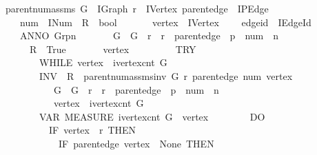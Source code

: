 \begin{isabellebody}
\ parent{\isacharunderscore}num{\isacharunderscore}assms\ {\isacharparenleft}G\ {\isacharcolon}{\isacharcolon}\ IGraph{\isacharcomma}\ r\ {\isacharcolon}{\isacharcolon}\ IVertex{\isacharcomma}\ parent{\isacharunderscore}edge\ {\isacharcolon}{\isacharcolon}\ IPEdge{\isacharcomma}\isanewline
\ \ \ \ num\ {\isacharcolon}{\isacharcolon}\ INum\ {\isacharbar}\ R\ {\isacharcolon}{\isacharcolon}\ bool{\isacharparenright}\isanewline
\ \ \isanewline
\ \ \ \ vertex\ {\isacharcolon}{\isacharcolon}\ IVertex\isanewline
\ \ \ \ edge{\isacharunderscore}id\ {\isacharcolon}{\isacharcolon}\ IEdge{\isacharunderscore}Id\isanewline
\ \ \ {\isachardoublequoteopen}\isanewline
\ \ \ \ ANNO\ {\isacharparenleft}G{\isacharcomma}r{\isacharcomma}p{\isacharcomma}n{\isacharparenright}{\isachardot}\isanewline
\ \ \ \ \ \ {\isasymlbrace}\ {\isasymacute}G\ {\isacharequal}\ G\ {\isasymand}\ {\isasymacute}r\ {\isacharequal}\ r\ {\isasymand}\ {\isasymacute}parent{\isacharunderscore}edge\ {\isacharequal}\ p\ {\isasymand}\ {\isasymacute}num\ {\isacharequal}\ n\ {\isasymrbrace}\isanewline
\ \ \ \ \ \ {\isasymacute}R\ {\isacharcolon}{\isacharequal}{\isacharequal}\ True\ {\isacharsemicolon}{\isacharsemicolon}\isanewline
\ \ \ \ \ \ {\isasymacute}vertex\ {\isacharcolon}{\isacharequal}{\isacharequal}\ {}\ {\isacharsemicolon}{\isacharsemicolon}\isanewline
\ \ \ \ \ \ TRY\isanewline
\ \ \ \ \ \ \ \ WHILE\ {\isasymacute}vertex\ {\isacharless}\ ivertex{\isacharunderscore}cnt\ {\isasymacute}G\isanewline
\ \ \ \ \ \ \ \ INV\ {\isasymlbrace}\ {\isasymacute}R\ {\isacharequal}\ parent{\isacharunderscore}num{\isacharunderscore}assms{\isacharunderscore}inv\ {\isasymacute}G\ {\isasymacute}r\ {\isasymacute}parent{\isacharunderscore}edge\ {\isasymacute}num\ {\isasymacute}vertex\isanewline
\ \ \ \ \ \ \ \ \ \ {\isasymand}\ {\isasymacute}G\ {\isacharequal}\ G\ {\isasymand}\ {\isasymacute}r\ {\isacharequal}\ r\ {\isasymand}\ {\isasymacute}parent{\isacharunderscore}edge\ {\isacharequal}\ p\ {\isasymand}\ {\isasymacute}num\ {\isacharequal}\ n\isanewline
\ \ \ \ \ \ \ \ \ \ {\isasymand}\ {\isasymacute}vertex\ {\isasymle}\ ivertex{\isacharunderscore}cnt\ {\isasymacute}G{\isasymrbrace}\isanewline
\ \ \ \ \ \ \ \ VAR\ MEASURE\ {\isacharparenleft}ivertex{\isacharunderscore}cnt\ {\isasymacute}G\ {\isacharminus}\ {\isasymacute}vertex{\isacharparenright}\isanewline
\ \ \ \ \ \ \ \ DO\isanewline
\ \ \ \ \ \ \ \ \ \ IF\ {\isacharparenleft}{\isasymacute}vertex\ {\isasymnoteq}\ {\isasymacute}r{\isacharparenright}\ THEN\isanewline
\ \ \ \ \ \ \ \ \ \ \ \ IF\ {\isasymacute}parent{\isacharunderscore}edge\ {\isasymacute}vertex\ {\isacharequal}\ None\ THEN\isanewline

\end{isabellebody}
